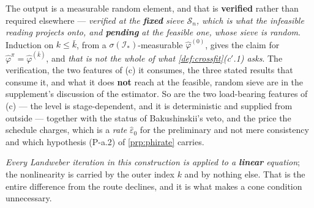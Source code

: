 \begin{definition}
The output is a measurable random element, and that is \textbf{verified} rather than required
elsewhere --- \emph{verified at the \textbf{fixed} sieve $\mathcal S_n$, which is what the infeasible
reading projects onto, and \textbf{pending} at the feasible one, whose sieve is random}. Induction on
$k\le\bar k$, from a $\sigma(\mathcal I_\ast)$-measurable $\hat\varphi^{(0)}$, gives the claim for
$\hat\varphi^{\pi}=\hat\varphi^{(\bar k)}$, and \emph{that is not the whole of what
\cref{def:crossfit}\textup{(c$'$.1)} asks}. The verification, the two features of \textup{(c)} it
consumes, the three stated results that consume it, and what it does \textbf{not} reach at the
feasible, random sieve are in the supplement's discussion of the estimator. So are the two
load-bearing features of \textup{(c)} --- the level is stage-dependent, and it is deterministic and
supplied from outside --- together with the status of Bakushinskii's veto, and the price the schedule
charges, which is a \emph{rate} $\hat\varepsilon_0$ for the preliminary and not mere consistency and
which hypothesis (P-a.2) of \cref{prp:phirate} carries.

\emph{Every Landweber iteration in this construction is applied to a \textbf{linear} equation}; the
nonlinearity is carried by the outer index $k$ and by nothing else. That is the entire difference from
the route  declines, and it is what makes a cone condition unnecessary.
\end{definition}



